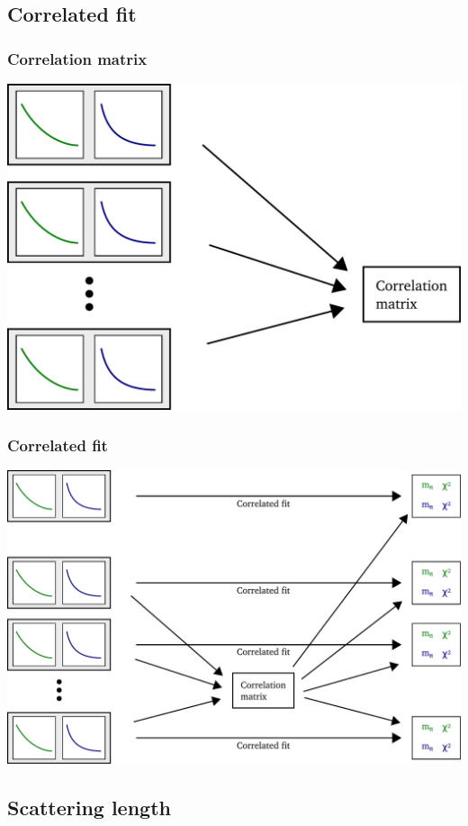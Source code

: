 \documentclass[english, fleqn]{beamer}
\begin{document}
\subsection{Correlated fit}

\begin{frame}
    \frametitle{Correlation matrix}
    \includegraphics[scale=\scale]{sketches/05-matrix.pdf}
\end{frame}

\begin{frame}
    \frametitle{Correlated fit}
    \includegraphics[scale=\scale]{sketches/06-fit.pdf}
\end{frame}

\subsection{Scattering length}
\end{document}
